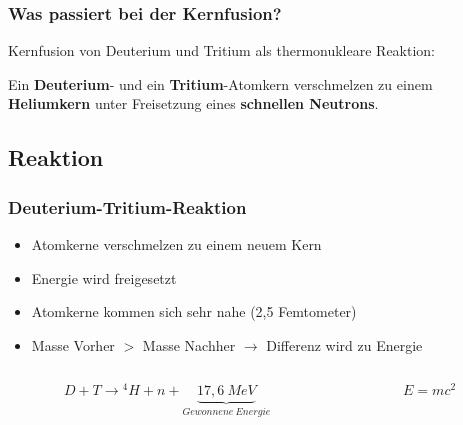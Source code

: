 \documentclass[aspectratio=169]{beamer}
\begin{document}
      \begin{frame}
        \frametitle{Was passiert bei der Kernfusion?}
        \center
        Kernfusion von Deuterium und Tritium als thermonukleare Reaktion:

        \bigskip
        \pause

        \bigskip

        Ein \textbf{Deuterium}- und ein \textbf{Tritium}-Atomkern verschmelzen zu einem \textbf{Heliumkern} unter Freisetzung eines \textbf{schnellen Neutrons}.

      \end{frame}

    \subsection{Reaktion}

      \begin{frame}
        \frametitle{Deuterium-Tritium-Reaktion}
        \begin{itemize}
          \item Atomkerne verschmelzen zu einem neuem Kern
          \item Energie wird freigesetzt
          \item Atomkerne kommen sich sehr nahe (2,5 Femtometer)
          \item Masse Vorher \( > \) Masse Nachher \( \rightarrow \) Differenz wird zu Energie
        \end{itemize}
        \bigskip

        \begin{columns}[T]
          \begin{column}{0.5\textwidth}
            \begin{equation*}
              D + T \rightarrow {}^4 H + n + \underbrace{ 17,6~MeV }_{Gewonnene~Energie}
            \end{equation*}
          \end{column}
          \begin{column}{0.5\textwidth}
            \begin{equation*}
              E = mc^2
            \end{equation*}
          \end{column}
        \end{columns}
      \end{frame}
\end{document}
